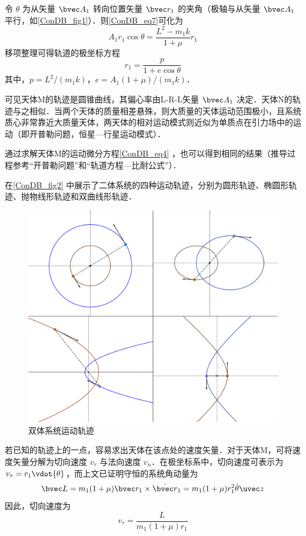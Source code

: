 令 $\theta$ 为从矢量 $\bvec A_1$ 转向位置矢量 $\bvec r_1$ 的夹角（极轴与从矢量 $\bvec A_1$ 平行，如\autoref{ConDB_fig1}）．则\autoref{ConDB_eq7}可化为
\begin{equation}
A_1r_1\cos\theta = \frac{L^2-m_1k}{1+\mu}r_1
\end{equation}
移项整理可得轨道的极坐标方程
\begin{equation}\label{ConDB_eq9}
r_1=\frac{p}{1+e \cos\theta}
\end{equation}
其中，$p=L^2/(m_1k)$，$e=A_1(1+\mu)/(m_1k)$．

可见天体M的轨迹是圆锥曲线，其偏心率由L-R-L矢量 $\bvec A_1$ 决定．天体N的轨迹与之相似．当两个天体的质量相差悬殊，则大质量的天体运动范围极小，且系统质心非常靠近大质量天体，两天体的相对运动模式则近似为单质点在引力场中的运动（即开普勒问题，恒星—行星运动模式）．

通过求解天体M的运动微分方程\autoref{ConDB_eq4} ，也可以得到相同的结果（推导过程参考“开普勒问题”和“轨道方程—比耐公式”）．

在\autoref{ConDB_fig2} 中展示了二体系统的四种运动轨迹，分别为圆形轨迹、椭圆形轨迹、抛物线形轨迹和双曲线形轨迹．
\begin{figure}[ht]
\centering
\includegraphics[width=14cm]{./figures/ConDB2.pdf}
\caption{双体系统运动轨迹} \label{ConDB_fig2}
\end{figure}

若已知的轨迹上的一点，容易求出天体在该点处的速度矢量．对于天体M，可将速度矢量分解为切向速度 $v_\tau$ 与法向速度 $v_n$．在极坐标系中，切向速度可表示为 $v_\tau =r_1\vdot{\theta}$，而上文已证明守恒的系统角动量为
\begin{equation}\label{ConDB_eq10}
\bvec L  = m_1(1+\mu)\bvec r_1 \times \dot{\bvec r}_1= m_1(1+\mu)r_1^2\dot{\theta}\uvec z
\end{equation}
因此，切向速度为
\begin{equation}
v_\tau =\frac{L}{m_1(1+\mu)r_1}
\end{equation}


